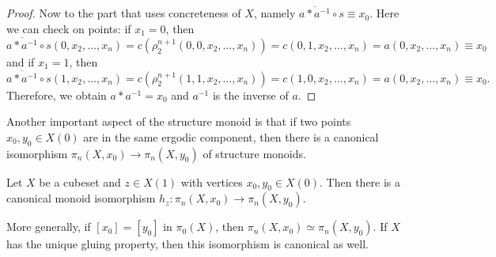 \begin{proof}
Now to the part that uses concreteness of $X$, namely $\overline{a*a^{-1}}\circ s \equiv x_0$.
Here we can check on points:
if $x_1 = 0$, then
\[
    \overline{a*a^{-1}}\circ s(0,x_2,\ldots,x_n)
    = c(\rho_2^{n+1}(0,0,x_2,\ldots,x_n))
    = c(0,1,x_2,\ldots,x_n)
    = a(0,x_2,\ldots,x_n)
    \equiv x_0
\]
and if $x_1 = 1$, then
\[
    \overline{a*a^{-1}}\circ s(1,x_2,\ldots,x_n)
    = c(\rho_2^{n+1}(1,1,x_2,\ldots,x_n))
    = c(1,0,x_2,\ldots,x_n)
    = a(0,x_2,\ldots,x_n)
    \equiv x_0.
\]
Therefore, we obtain $a*a^{-1} = x_0$ and $a^{-1}$ is the inverse of $a$.
\end{proof}

Another important aspect of the structure monoid is that if two points $x_0,y_0\in X(0)$
are in the same ergodic component, then there is a canonical isomorphism $\pi_n(X,x_0)\to\pi_n(X,y_0)$
of structure monoids.

\begin{proposition}\label{prop:structure-monoid-independence-base-point}
Let $X$ be a cubeset and $z\in X(1)$ with vertices $x_0,y_0\in X(0)$.
Then there is a canonical monoid isomorphism $h_z\colon\pi_n(X,x_0)\to\pi_n(X,y_0)$.

More generally, if $[x_0]=[y_0]$ in $\pi_0(X)$, then $\pi_n(X,x_0)\simeq\pi_n(X,y_0)$.
If $X$ has the unique gluing property, then this isomorphism is canonical as well.
\end{proposition}

